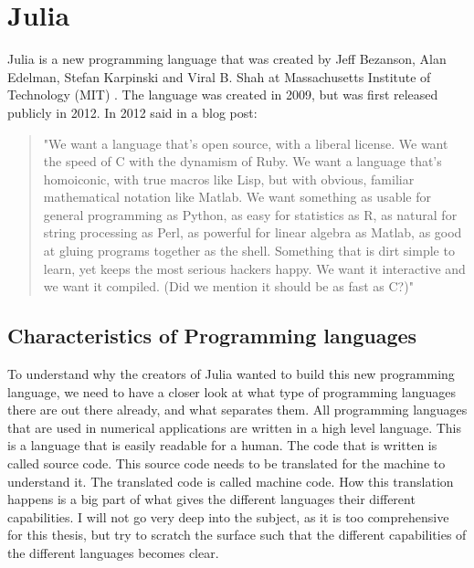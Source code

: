 \chapter{Julia}
\label{ch:Julia}
Julia is a new programming language that was created by Jeff Bezanson, Alan Edelman, Stefan Karpinski and Viral B. Shah at Massachusetts Institute of Technology (MIT) \citep{juliaLab}. The language was created in 2009, but was first released publicly in 2012. In 2012 \cite{juliaBlogRelease2012} said in a blog post:
\begin{quotation}
"We want a language that’s open source, with a liberal license. We want the speed of C with the dynamism of Ruby. We want a language that’s homoiconic, with true macros like Lisp, but with obvious, familiar mathematical notation like Matlab. We want something as usable for general programming as Python, as easy for statistics as R, as natural for string processing as Perl, as powerful for linear algebra as Matlab, as good at gluing programs together as the shell. Something that is dirt simple to learn, yet keeps the most serious hackers happy. We want it interactive and we want it compiled. (Did we mention it should be as fast as C?)"
\end{quotation}

\section{Characteristics of Programming languages}
To understand why the creators of Julia wanted to build this new programming language, we need to have a closer look at what type of programming languages there are out there already, and what separates them. All programming languages that are used in numerical applications are written in a high level language. This is a language that is easily readable for a human. The code that is written is called source code. This source code needs to be translated for the machine to understand it. The translated code is called machine code. How this translation happens is a big part of what gives the different languages their different capabilities. I will not go very deep into the subject, as it is too comprehensive for this thesis, but try to scratch the surface such that the different capabilities of the different languages becomes clear.

